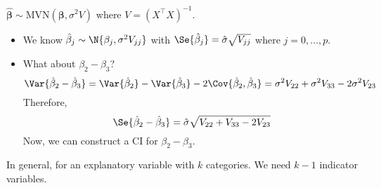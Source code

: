 $ \hat{\symbf{\beta}}\sim \text{MVN}(\symbf{\beta},\sigma^2 V) $
where $ V=(X^\top X)^{-1} $.
\begin{itemize}
    \item We know $ \hat{\beta}_j \sim \N{\beta_j,\sigma^2 V_{jj}} $
          with $ \Se{\hat{\beta}_j}=\hat{\sigma}\sqrt{V_{jj}} $
          where $ j=0,\ldots,p $.
    \item What about $ \beta_2-\beta_3 $?
          \[ \Var{\hat{\beta}_2-\hat{\beta}_3}=
              \Var{\hat{\beta}_2}-\Var{\hat{\beta}_3}-2\Cov{\hat{\beta}_2,\hat{\beta}_3}
              =\sigma^2V_{22}+\sigma^2V_{33}-2\sigma^2V_{23} \]
          Therefore,
          \[ \Se{\hat{\beta}_2-\hat{\beta}_3}=\hat{\sigma}\sqrt{V_{22}+V_{33}-2V_{23}} \]
          Now, we can construct a CI for $ \beta_2-\beta_3 $.
\end{itemize}
In general, for an explanatory variable with $ k $ categories.
We need $ k-1 $ indicator variables.
